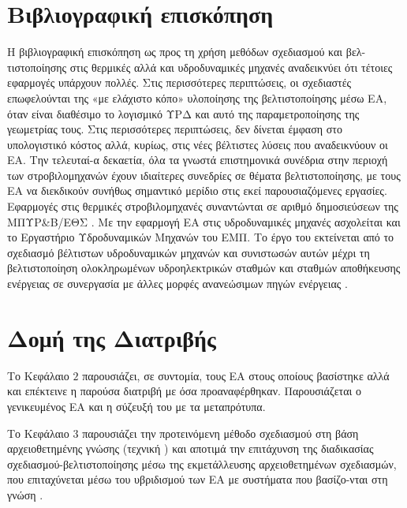 \section{Βιβλιογραφική επισκόπηση}
Η βιβλιογραφική επισκόπηση ως προς τη χρήση μεθόδων σχεδιασμού και βελ-τιστοποίησης στις θερμικές αλλά και υδροδυναμικές μηχανές αναδεικνύει ότι τέτοιες εφαρμογές υπάρχουν πολλές. Στις περισσότερες περιπτώσεις, οι σχεδιαστές επωφελούνται της «με ελάχιστο κόπο» υλοποίησης της βελτιστοποίησης μέσω ΕΑ, όταν είναι διαθέσιμο το λογισμικό ΥΡΔ και αυτό της παραμετροποίησης της γεωμετρίας τους. Στις περισσότερες περιπτώσεις, δεν δίνεται έμφαση στο υπολογιστικό κόστος αλλά, κυρίως, στις νέες βέλτιστες λύσεις που αναδεικνύουν οι ΕΑ. Την τελευταί-α δεκαετία, όλα τα γνωστά επιστημονικά συνέδρια στην περιοχή των στροβιλομηχανών έχουν ιδιαίτερες συνεδρίες σε θέματα βελτιστοποίησης, με τους ΕΑ να διεκδικούν συνήθως σημαντικό μερίδιο στις εκεί παρουσιαζόμενες εργασίες. Εφαρμογές στις θερμικές στροβιλομηχανές συναντώνται σε αριθμό δημοσιεύσεων της ΜΠΥΡ\&Β/ΕΘΣ \cite{LTT_2_018,LTT_2_020,LTT_2_023,LTT_2_026,LTT_2_031,LTT_2_040, LTT_2_045}.
Με την εφαρμογή ΕΑ στις υδροδυναμικές μηχανές ασχολείται και το Εργαστήριο Υδροδυναμικών Μηχανών του ΕΜΠ. Το έργο του εκτείνεται από το σχεδιασμό βέλτιστων υδροδυναμικών μηχανών και συνιστωσών αυτών \cite{Anagno4} μέχρι τη βελτιστοποίηση ολοκληρωμένων υδροηλεκτρικών σταθμών και σταθμών αποθήκευσης ενέργειας σε συνεργασία με άλλες μορφές ανανεώσιμων πηγών ενέργειας \cite{Anagno3,Anagno5}.             


 
\section{Δομή της Διατριβής} %

Το Κεφάλαιο $2$ παρουσιάζει, σε συντομία, τους ΕΑ στους οποίους βασίστηκε αλλά και επέκτεινε η παρούσα διατριβή με όσα προαναφέρθηκαν. Παρουσιάζεται ο γενικευμένος ΕΑ και η σύζευξή του με τα μεταπρότυπα.

Το Κεφάλαιο $3$ παρουσιάζει την προτεινόμενη μέθοδο σχεδιασμού στη βάση αρχειοθετημένης γνώσης (τεχνική ) και αποτιμά την επιτάχυνση της διαδικασίας σχεδιασμού-βελτιστοποίησης μέσω της εκμετάλλευσης αρχειοθετημένων σχεδιασμών, που επιταχύνεται μέσω του υβριδισμού των ΕΑ με συστήματα που βασίζο-νται στη γνώση .  


